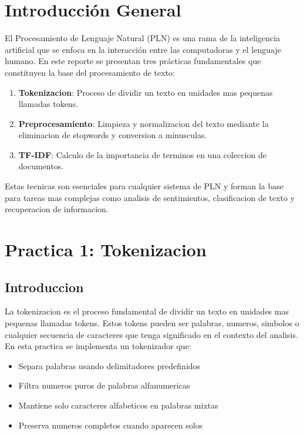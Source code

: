 \documentclass[12pt,a4paper]{article}
\begin{document}
\tableofcontents
\newpage

\section{Introducción General}

El Procesamiento de Lenguaje Natural (PLN) es una rama de la inteligencia artificial que se enfoca en la interacción entre las computadoras y el lenguaje humano. En este reporte se presentan tres prácticas fundamentales que constituyen la base del procesamiento de texto:

\begin{enumerate}
    \item \textbf{Tokenizacion}: Proceso de dividir un texto en unidades mas pequenas llamadas tokens.
    \item \textbf{Preprocesamiento}: Limpieza y normalizacion del texto mediante la eliminacion de stopwords y conversion a minusculas.
    \item \textbf{TF-IDF}: Calculo de la importancia de terminos en una coleccion de documentos.
\end{enumerate}

Estas tecnicas son esenciales para cualquier sistema de PLN y forman la base para tareas mas complejas como analisis de sentimientos, clasificacion de texto y recuperacion de informacion.

\newpage

\section{Practica 1: Tokenizacion}

\subsection{Introduccion}

La tokenizacion es el proceso fundamental de dividir un texto en unidades mas pequenas llamadas tokens. Estos tokens pueden ser palabras, numeros, simbolos o cualquier secuencia de caracteres que tenga significado en el contexto del analisis. En esta practica se implementa un tokenizador que:

\begin{itemize}
    \item Separa palabras usando delimitadores predefinidos
    \item Filtra numeros puros de palabras alfanumericas
    \item Mantiene solo caracteres alfabeticos en palabras mixtas
    \item Preserva numeros completos cuando aparecen solos
\end{itemize}
\end{document}
